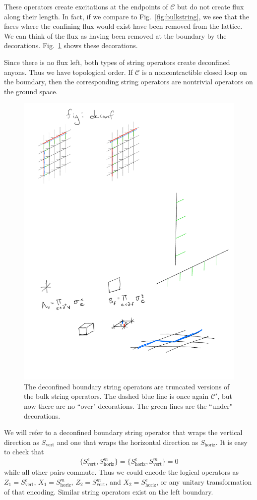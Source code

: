 \documentclass[twocolumn, longbibliography]{revtex4-2}
\newcommand{\C}{\mathcal{C}}
\renewcommand{\vert}{\text{vert}}
\newcommand{\horiz}{\text{horiz}}
\begin{document}
These operators create excitations at the endpoints of $\C$ but do not create flux along their length.  In fact, if we compare to Fig.~\ref{fig:bulkstring}, we see that the faces where the confining flux would exist have been removed from the lattice.
We can think of the flux as having been removed at the boundary by the decorations.  Fig.~\ref{fig:deconf} shows these decorations. 

Since there is no flux left, both types of string operators create deconfined anyons. Thus we have topological order.
If $\C$ is a noncontractible closed loop on the boundary, then the corresponding string operators are nontrivial operators on the ground space.

\begin{figure}
\centering
\includegraphics[width=.5\linewidth]{deconf}
\caption{The deconfined boundary string operators are truncated versions of the bulk string operators. The dashed blue line is once again $\C'$, but now there are no ``over" decorations. The green lines are the ``under" decorations.}
\label{fig:deconf}
\end{figure}

We will refer to a deconfined boundary string operator that wraps the vertical direction as $S_\vert$ and one that wraps the horizontal direction as $S_\horiz$. It is easy to check that 
\begin{align}
\{S^e_\vert,S^m_\horiz\}=\{S^e_\horiz,S^m_\vert\}=0
\end{align}
while all other pairs commute. Thus we could encode the logical operators as $Z_1=S^e_\vert$, $X_1 = S^m_\horiz$, $Z_2 = S^m_\vert$, and $X_2 = S^e_\horiz$, or any unitary transformation of that encoding. Similar string operators exist on the left boundary.
\end{document}
